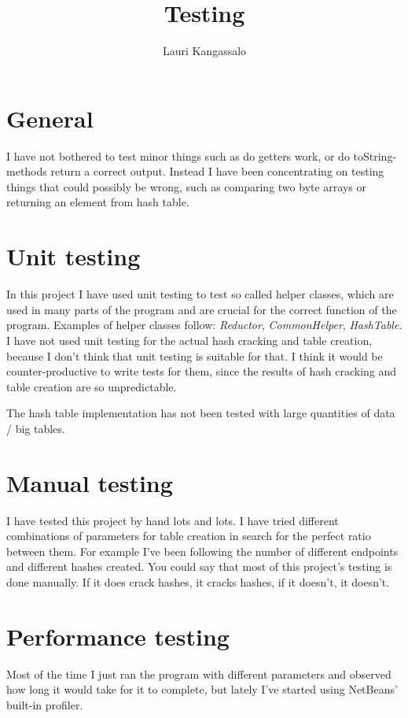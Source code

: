 \documentclass[a4paper, 11pt, finnish]{article}
\title{Testing}
\author{Lauri Kangassalo}
\begin{document}
  \maketitle
\section*{General}
I have not bothered to test minor things such as do getters work, or do toString-methods return a correct output. Instead I have been concentrating on testing things that could possibly be wrong, such as comparing two byte arrays or returning an element from hash table.

\section*{Unit testing}
In this project I have used unit testing to test so called helper classes, which are used in many parts of the program and are crucial for the correct function of the program. Examples of helper classes follow: \emph{Reductor}, \emph{CommonHelper}, \emph{HashTable}. I have not used unit testing for the actual hash cracking and table creation, because I don't think that unit testing is suitable for that. I think it would be counter-productive to write tests for them, since the results of hash cracking and table creation are so unpredictable.

The hash table implementation has not been tested with large quantities of data / big tables.

\section*{Manual testing}
I have tested this project by hand lots and lots. I have tried different combinations of parameters for table creation in search for the perfect ratio between them. For example I've been following the number of different endpoints and different hashes created. You could say that most of this project's testing is done manually. If it does crack hashes, it cracks hashes, if it doesn't, it doesn't.

\section*{Performance testing}
Most of the time I just ran the program with different parameters and observed how long it would take for it to complete, but lately I've started using NetBeans' built-in profiler.
\end{document}
